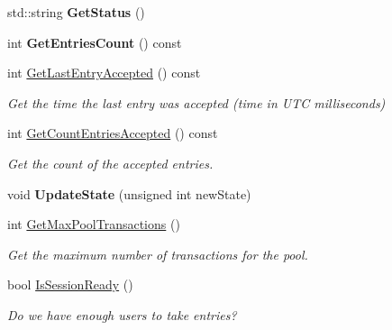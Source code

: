 \begin{DoxyCompactItemize}
std\+::string {\bfseries Get\+Status} ()
\item 
\mbox{\label{class_c_obfuscation_pool_aedc697c39350c594b54161ff79aec21f}} 
int {\bfseries Get\+Entries\+Count} () const
\item 
\mbox{\label{class_c_obfuscation_pool_a27cc4addb641435a015ea7cd06af05d8}} 
int \mbox{\hyperlink{class_c_obfuscation_pool_a27cc4addb641435a015ea7cd06af05d8}{Get\+Last\+Entry\+Accepted}} () const
\begin{DoxyCompactList}\small\item\em Get the time the last entry was accepted (time in U\+TC milliseconds) \end{DoxyCompactList}\item 
\mbox{\label{class_c_obfuscation_pool_aadd23259de92eca6317dd2c91cf043d8}} 
int \mbox{\hyperlink{class_c_obfuscation_pool_aadd23259de92eca6317dd2c91cf043d8}{Get\+Count\+Entries\+Accepted}} () const
\begin{DoxyCompactList}\small\item\em Get the count of the accepted entries. \end{DoxyCompactList}\item 
\mbox{\label{class_c_obfuscation_pool_a4b32548a55c50b6b637c642234902870}} 
void {\bfseries Update\+State} (unsigned int new\+State)
\item 
\mbox{\label{class_c_obfuscation_pool_adc64754346e8f5c546458b054c618238}} 
int \mbox{\hyperlink{class_c_obfuscation_pool_adc64754346e8f5c546458b054c618238}{Get\+Max\+Pool\+Transactions}} ()
\begin{DoxyCompactList}\small\item\em Get the maximum number of transactions for the pool. \end{DoxyCompactList}\item 
\mbox{\label{class_c_obfuscation_pool_abb8ce0f1c6e52ecb23434c09f64ea273}} 
bool \mbox{\hyperlink{class_c_obfuscation_pool_abb8ce0f1c6e52ecb23434c09f64ea273}{Is\+Session\+Ready}} ()
\begin{DoxyCompactList}\small\item\em Do we have enough users to take entries? \end{DoxyCompactList}\item 

\end{DoxyCompactItemize}
